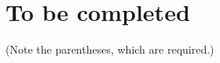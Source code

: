 \documentclass[11pt,a4paper,twoside]{article}
\begin{document}

\section{To be completed}

\label{sec:regularity}

\label{sec:ancestors}

\label{sec:opaque}
(Note the parentheses, which are required.)

\label{sec:oo:self}





\end{document}
